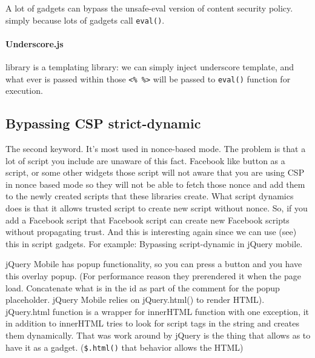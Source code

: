 A lot of gadgets can bypass the unsafe-eval version of content security policy. simply because lots of gadgets call \verb|eval()|. 

\paragraph{Underscore.js}

library is a templating library: we can simply inject underscore template, and what ever is passed within those \verb|<% %>| will be passed to \verb|eval()| function for execution. 



\subsection{Bypassing CSP strict-dynamic}
The second keyword. It’s most used in nonce-based mode. The problem is that a lot of script you include are unaware of this fact. Facebook like button as a script, or some other widgets those script will not aware that you are using CSP in nonce based mode so they will not be able to fetch those nonce and add them to the newly created scripts that these libraries create. What script dynamics does is that it allows trusted script to create new script without nonce. So, if you add a Facebook script that Facebook script can create new Facebook scripts without propagating trust. And this is interesting again since we can use (see) this in script gadgets. For example: Bypassing script-dynamic in jQuery mobile.



jQuery Mobile has popup functionality, so you can press a button and you have this overlay popup. 
(For performance reason they prerendered it when the page load. Concatenate what is in the id as part of the comment for the popup placeholder. jQuery Mobile relies on jQuery.html() to render HTML). jQuery.html function is a wrapper for innerHTML function with one exception, it in addition to innerHTML tries to look for script tags in the string and creates them dynamically. That was work around by jQuery is the thing that allows as to have it as a gadget. (\verb|$.html()|  that behavior allows the HTML)

